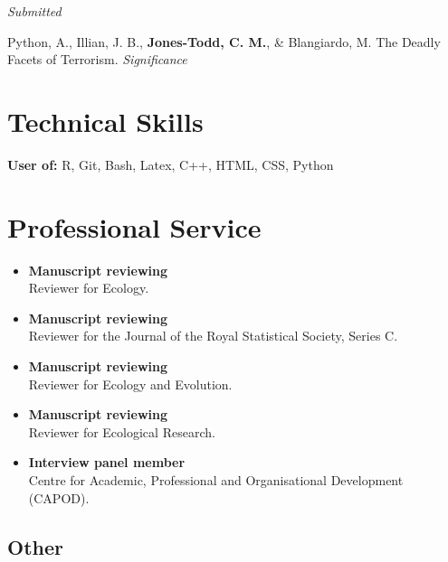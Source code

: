 \documentclass[10pt,a4paper]{moderncv}
\begin{document}
\vspace{5pt}

\textit{\small{Submitted}}\\

\vspace{-3pt}

Python, A.,  Illian, J. B., \textbf{Jones-Todd, C. M.}, \& Blangiardo, M. The Deadly Facets of Terrorism. \textit{Significance} \\

\vspace{5pt}

\section{Technical Skills}

\vspace{6pt}
    \textbf{User of:} R, Git, Bash, Latex, C++, HTML, CSS, Python


\section{Professional Service}

\vspace{6pt}

\begin{itemize}
  \item \textbf{Manuscript reviewing}\\
Reviewer for Ecology.
 \item \textbf{Manuscript reviewing}\\
Reviewer for the Journal of the Royal Statistical Society, Series C.
 \item \textbf{Manuscript reviewing}\\
   Reviewer for Ecology and Evolution.
   \item \textbf{Manuscript reviewing}\\
Reviewer for Ecological Research.
\item \textbf{Interview panel member}\\
 Centre for Academic, Professional and Organisational Development (CAPOD).
\end{itemize}

\subsection{Other}
\end{document}
